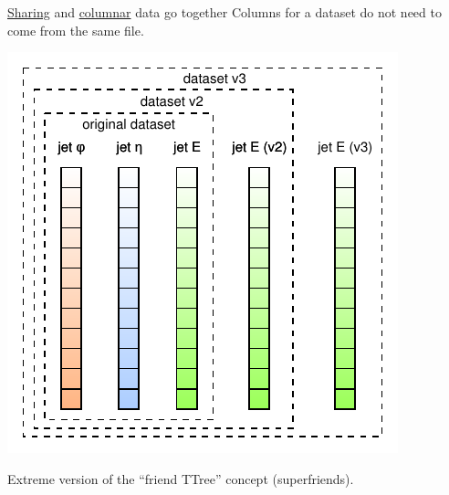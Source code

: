 \documentclass{beamer}
\begin{document}
\begin{frame}{\underline{Sharing} and \underline{columnar} data go together}
\vspace{0.5 cm}
Columns for a dataset do not need to come from the same file.

\begin{center}
\includegraphics[width=0.6\linewidth]{virtual-datasets.pdf}
\end{center}

\vspace{-0.25 cm}
Extreme version of the ``friend TTree'' concept (superfriends).
\end{frame}
\end{document}
